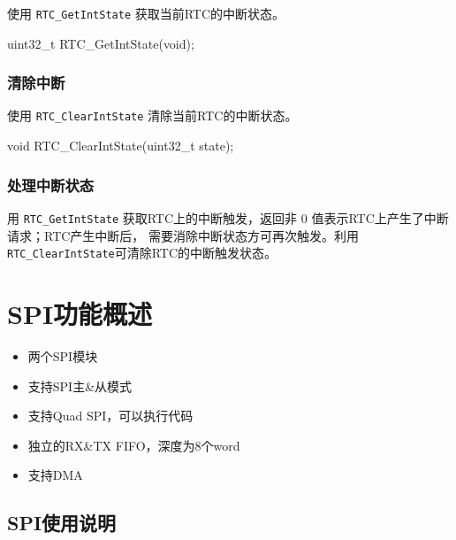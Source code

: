 \documentclass[
  12pt,
]{book}
\newenvironment{Shaded}{\begin{snugshade}}{\end{snugshade}}
\newcommand{\DataTypeTok}[1]{\textcolor[rgb]{0.13,0.29,0.53}{#1}}
\newcommand{\NormalTok}[1]{#1}
\providecommand{\tightlist}{%
  \setlength{\itemsep}{0pt}\setlength{\parskip}{0pt}}
\begin{document}
使用 \texttt{RTC\_GetIntState} 获取当前RTC的中断状态。

\begin{Shaded}
\begin{Highlighting}[]
\DataTypeTok{uint32_t}\NormalTok{ RTC_GetIntState(}\DataTypeTok{void}\NormalTok{);}
\end{Highlighting}
\end{Shaded}

\hypertarget{ux6e05ux9664ux4e2dux65ad}{%
\subsection{清除中断}\label{ux6e05ux9664ux4e2dux65ad}}

使用 \texttt{RTC\_ClearIntState} 清除当前RTC的中断状态。

\begin{Shaded}
\begin{Highlighting}[]
\DataTypeTok{void}\NormalTok{ RTC_ClearIntState(}\DataTypeTok{uint32_t}\NormalTok{ state);}
\end{Highlighting}
\end{Shaded}

\hypertarget{ux5904ux7406ux4e2dux65adux72b6ux6001-1}{%
\subsection{处理中断状态}\label{ux5904ux7406ux4e2dux65adux72b6ux6001-1}}

用 \texttt{RTC\_GetIntState} 获取RTC上的中断触发，返回非 0 值表示RTC上产生了中断请求；RTC产生中断后，
需要消除中断状态方可再次触发。利用 \texttt{RTC\_ClearIntState}可清除RTC的中断触发状态。

\hypertarget{spiux529fux80fdux6982ux8ff0}{%
\chapter{SPI功能概述}\label{spiux529fux80fdux6982ux8ff0}}

\begin{itemize}
\tightlist
\item
  两个SPI模块
\item
  支持SPI主\&从模式
\item
  支持Quad SPI，可以执行代码
\item
  独立的RX\&TX FIFO，深度为8个word
\item
  支持DMA
\end{itemize}

\hypertarget{spiux4f7fux7528ux8bf4ux660e}{%
\section{SPI使用说明}\label{spiux4f7fux7528ux8bf4ux660e}}
\end{document}
